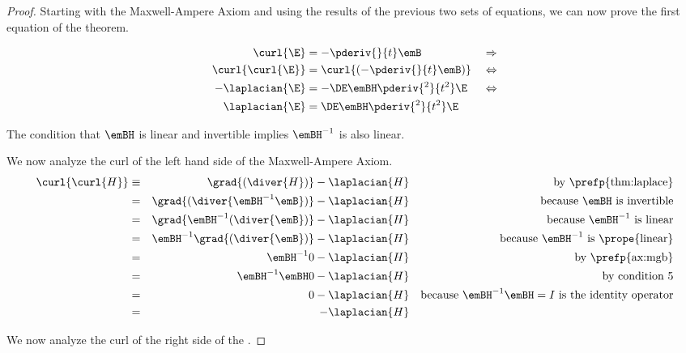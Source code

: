 \begin{proof}
Starting with the Maxwell-Ampere Axiom and using
the results of the previous two sets of equations, we can now prove
the first equation of the theorem.

\begin{align*}
   \curl{\E}        &= -\pderiv{}{t}\emB                     && \Rightarrow \\
   \curl{\curl{\E}} &= \curl{(-\pderiv{}{t}\emB)}            && \Leftrightarrow \\
   - \laplacian{\E} &= -\DE \emBH \pderiv{^2}{t^2}\E         && \Leftrightarrow \\
   \laplacian{\E}   &= \DE \emBH \pderiv{^2}{t^2}\E
\end{align*}



The condition that $\emBH$ is linear and invertible implies $\emBH^{-1}$ is also linear.

We now analyze the curl of the left hand side of the Maxwell-Ampere Axiom.
\begin{align*}
   \curl{\curl{H}}
   &\equiv& \grad{(\diver{H})} - \laplacian{H}
   && \text{by \prefp{thm:laplace}}
   \\ &=&
   \grad{(\diver{\emBH^{-1}\emB})} - \laplacian{H}
   && \text{because $\emBH$ is invertible}
   \\ &=&
   \grad{\emBH^{-1}(\diver{\emB})} - \laplacian{H}
   && \text{because $\emBH^{-1}$ is linear}
   \\ &=&
   \emBH^{-1}\grad{(\diver{\emB})} - \laplacian{H}
   && \text{because $\emBH^{-1}$ is \prope{linear}}
   \\ &=&
   \emBH^{-1}0 - \laplacian{H}
   && \text{by \prefp{ax:mgb}}
   \\ &=&
   \emBH^{-1}\emBH 0 - \laplacian{H}
   && \text{by condition 5}
   \\ &=&
   0 - \laplacian{H}
   && \text{because $\emBH^{-1}\emBH=I$ is the identity operator}
   \\ &=&
   - \laplacian{H}
\end{align*}

We now analyze the curl of the right side of the  .


\end{proof}

